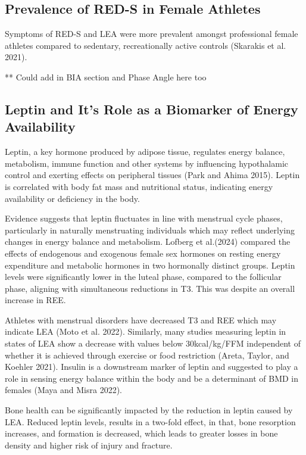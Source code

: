 \documentclass[
]{article}
\begin{document}
\subsection{Prevalence of RED-S in Female Athletes}\label{prevalence-of-red-s-in-female-athletes}

Symptoms of RED-S and LEA were more prevalent amongst professional female athletes compared to sedentary, recreationally active controls (Skarakis et al. 2021).

** Could add in BIA section and Phase Angle here too

\subsection{Leptin and It's Role as a Biomarker of Energy Availability}\label{leptin-and-its-role-as-a-biomarker-of-energy-availability}

Leptin, a key hormone produced by adipose tissue, regulates energy balance, metabolism, immune function and other systems by influencing hypothalamic control and exerting effects on peripheral tissues (Park and Ahima 2015). Leptin is correlated with body fat mass and nutritional status, indicating energy availability or deficiency in the body.

Evidence suggests that leptin fluctuates in line with menstrual cycle phases, particularly in naturally menstruating individuals which may reflect underlying changes in energy balance and metabolism. Lofberg et al.(2024) compared the effects of endogenous and exogenous female sex hormones on resting energy expenditure and metabolic hormones in two hormonally distinct groups. Leptin levels were significantly lower in the luteal phase, compared to the follicular phase, aligning with simultaneous reductions in T3. This was despite an overall increase in REE.

Athletes with menstrual disorders have decreased T3 and REE which may indicate LEA (Moto et al. 2022). Similarly, many studies measuring leptin in states of LEA show a decrease with values below 30kcal/kg/FFM independent of whether it is achieved through exercise or food restriction (Areta, Taylor, and Koehler 2021). Insulin is a downstream marker of leptin and suggested to play a role in sensing energy balance within the body and be a determinant of BMD in females (Maya and Misra 2022).

Bone health can be significantly impacted by the reduction in leptin caused by LEA. Reduced leptin levels, results in a two-fold effect, in that, bone resorption increases, and formation is decreased, which leads to greater losses in bone density and higher risk of injury and fracture.
\end{document}
